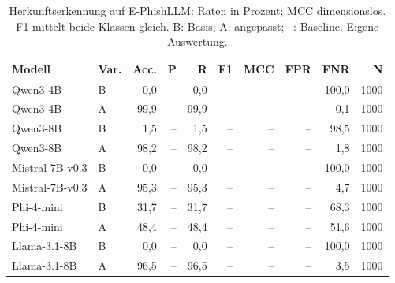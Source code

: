 \begin{table}[htbp]
\centering\scriptsize
\caption{Herkunftserkennung auf E-PhishLLM: Raten in Prozent; MCC dimensionslos. F1 mittelt beide Klassen gleich. B: Basis; A: angepasst; –: Baseline. Eigene Auswertung.}
\label{tab:result-origin-1}
\begin{tabular}{llrrrrrrrr}
\toprule
Modell & Var. & Acc. & P & R & F1 & MCC & FPR & FNR & N \\
\midrule
Qwen3-4B & B & 0{,}0 & – & 0{,}0 & – & -- & – & 100{,}0 & 1000 \\
Qwen3-4B & A & 99{,}9 & – & 99{,}9 & – & -- & – & 0{,}1 & 1000 \\
Qwen3-8B & B & 1{,}5 & – & 1{,}5 & – & -- & – & 98{,}5 & 1000 \\
Qwen3-8B & A & 98{,}2 & – & 98{,}2 & – & -- & – & 1{,}8 & 1000 \\
Mistral-7B-v0.3 & B & 0{,}0 & – & 0{,}0 & – & -- & – & 100{,}0 & 1000 \\
Mistral-7B-v0.3 & A & 95{,}3 & – & 95{,}3 & – & -- & – & 4{,}7 & 1000 \\
Phi-4-mini & B & 31{,}7 & – & 31{,}7 & – & -- & – & 68{,}3 & 1000 \\
Phi-4-mini & A & 48{,}4 & – & 48{,}4 & – & -- & – & 51{,}6 & 1000 \\
Llama-3.1-8B & B & 0{,}0 & – & 0{,}0 & – & -- & – & 100{,}0 & 1000 \\
Llama-3.1-8B & A & 96{,}5 & – & 96{,}5 & – & -- & – & 3{,}5 & 1000 \\
\bottomrule
\end{tabular}
\end{table}

